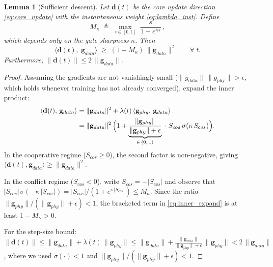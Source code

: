 \documentclass[10pt,a4paper]{amsart}
\newtheorem{lemma}{Lemma}
\begin{document}
\begin{lemma}[Sufficient descent]\label{lem:descent}
Let $\mathbf{d}(t)$ be the core update direction \eqref{eq:core_update} with the instantaneous weight \eqref{eq:lambda_inst}. Define
\[
M_\kappa \;\triangleq\; \max_{s \in [0,1]}\; \frac{s}{1 + e^{\kappa s}}\,,
\]
which depends only on the gate sharpness $\kappa$. Then
\[
\bigl\langle \mathbf{d}(t),\; \mathbf{g}_{data} \bigr\rangle \;\geq\; (1 - M_\kappa)\,\|\mathbf{g}_{data}\|^{2} \qquad \forall\; t.
\]
Furthermore, $\|\mathbf{d}(t)\| \leq 2\,\|\mathbf{g}_{data}\|$.
\end{lemma}

\begin{proof}
Assuming the gradients are not vanishingly small 
($\|g_{\mathrm{data}}\|\,\|g_{\mathrm{phy}}\| > \epsilon$, which holds 
whenever training has not already converged), expand the inner product:
\begin{align}
\langle \mathbf{d}(t),\, \mathbf{g}_{data} \rangle 
&= \|\mathbf{g}_{data}\|^{2} + \lambda(t)\, \langle \mathbf{g}_{phy},\, \mathbf{g}_{data} \rangle \notag \\
&= \|\mathbf{g}_{data}\|^{2}\, \Bigl(1 + \underbrace{\frac{\|\mathbf{g}_{phy}\|}{\|\mathbf{g}_{phy}\| + \epsilon}}_{\in\, (0,\, 1)} \;\cdot\; S_{cos}\, \sigma(\kappa\, S_{cos}) \Bigr). \label{eq:inner_expand}
\end{align}
In the cooperative regime ($S_{cos} \geq 0$), the second factor is non-negative, giving $\langle \mathbf{d}(t), \mathbf{g}_{data} \rangle \geq \|\mathbf{g}_{data}\|^{2}$.

In the conflict regime ($S_{cos} < 0$), write $S_{cos} = -|S_{cos}|$ and observe that $|S_{cos}|\,\sigma(-\kappa\,|S_{cos}|) = |S_{cos}|/(1 + e^{\kappa\,|S_{cos}|}) \leq M_\kappa$. Since the ratio $\|\mathbf{g}_{phy}\|/(\|\mathbf{g}_{phy}\| + \epsilon) < 1$, the bracketed term in \eqref{eq:inner_expand} is at least $1 - M_\kappa > 0$.

For the step-size bound: $\|\mathbf{d}(t)\| \leq \|\mathbf{g}_{data}\| + \lambda(t)\,\|\mathbf{g}_{phy}\| \leq \|\mathbf{g}_{data}\| + \frac{\|\mathbf{g}_{data}\|}{\|\mathbf{g}_{phy}\| + \epsilon}\, \|\mathbf{g}_{phy}\| < 2\,\|\mathbf{g}_{data}\|$, where we used $\sigma(\cdot) < 1$ and $\|\mathbf{g}_{phy}\|/(\|\mathbf{g}_{phy}\| + \epsilon) < 1$.
\end{proof}
\end{document}
